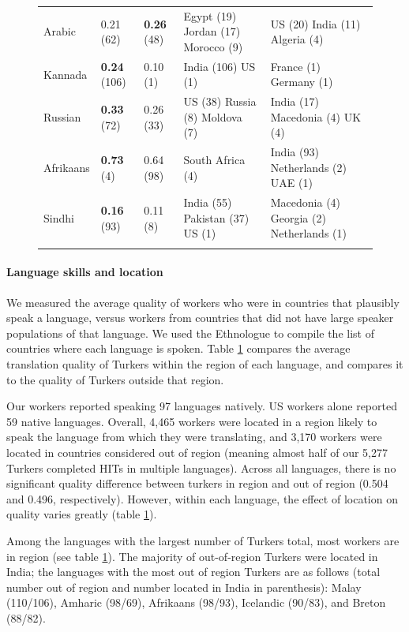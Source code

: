 \documentclass[11pt]{article}
\begin{document}
\begin{figure}[h]
\begin{tabular}{lllll}
Arabic&0.21 (62) &\textbf{0.26} (48)&Egypt (19) Jordan (17) Morocco (9) &US (20) India (11) Algeria (4) \\
Kannada&\textbf{0.24} (106)&0.10 (1)&India (106) US (1) &France (1) Germany (1) \\
Russian&\textbf{0.33} (72)&0.26 (33)&US (38) Russia (8) Moldova (7) &India (17) Macedonia (4) UK (4) \\
Afrikaans&\textbf{0.73} (4)&0.64 (98)&South Africa (4) &India (93) Netherlands (2) UAE (1) \\
Sindhi&\textbf{0.16} (93)&0.11 (8)&India (55) Pakistan (37) US (1) &Macedonia (4) Georgia (2) Netherlands (1) \\
\hline\hline
\label{region-summary}
\end{tabular}
\end{figure}


\paragraph{Language skills and location}

We measured the average quality of workers who were in countries that plausibly speak a language, versus workers from countries that did not have large speaker populations of that language.  We used the Ethnologue \cite{ethnologue} to compile the list of countries where each language is spoken.  Table \ref{region-summary} compares the average translation quality of Turkers within the region of each language, and compares it to the quality of Turkers outside that region. 

Our workers reported speaking 97 languages natively. US workers alone reported 59 native languages. Overall, 4,465 workers were located in a region likely to speak the language from which they were translating, and 3,170 workers were located in countries considered out of region (meaning almost half of our 5,277 Turkers completed HITs in multiple languages). Across all languages, there is no significant quality difference between turkers in region and out of region (0.504 and 0.496, respectively). However, within each language, the effect of location on quality varies greatly (table \ref{region-summary}). 

Among the languages with the largest number of Turkers total, most workers are in region (see table \ref{region-summary}). The majority of out-of-region Turkers were located in India; the languages with the most out of region Turkers are as follows (total number out of region and number located in India in parenthesis): Malay (110/106), Amharic (98/69), Afrikaans (98/93), Icelandic (90/83), and Breton (88/82).
\end{document}
